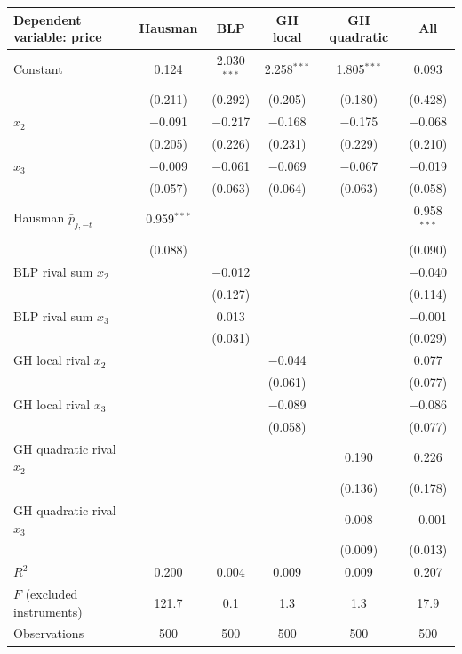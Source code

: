 \begin{tabular}{lccccc}
\toprule
Dependent variable: price & Hausman & BLP & GH local & GH quadratic & All \\
\midrule
Constant & 0.124 & 2.030$^{***}$ & 2.258$^{***}$ & 1.805$^{***}$ & 0.093 \\
 & (0.211) & (0.292) & (0.205) & (0.180) & (0.428) \\
$x_2$ & $-$0.091 & $-$0.217 & $-$0.168 & $-$0.175 & $-$0.068 \\
 & (0.205) & (0.226) & (0.231) & (0.229) & (0.210) \\
$x_3$ & $-$0.009 & $-$0.061 & $-$0.069 & $-$0.067 & $-$0.019 \\
 & (0.057) & (0.063) & (0.064) & (0.063) & (0.058) \\
Hausman $\bar p_{j,-t}$ & 0.959$^{***}$ &  &  &  & 0.958$^{***}$ \\
 & (0.088) &  &  &  & (0.090) \\
BLP rival sum $x_2$ &  & $-$0.012 &  &  & $-$0.040 \\
 &  & (0.127) &  &  & (0.114) \\
BLP rival sum $x_3$ &  & 0.013 &  &  & $-$0.001 \\
 &  & (0.031) &  &  & (0.029) \\
GH local rival $x_2$ &  &  & $-$0.044 &  & 0.077 \\
 &  &  & (0.061) &  & (0.077) \\
GH local rival $x_3$ &  &  & $-$0.089 &  & $-$0.086 \\
 &  &  & (0.058) &  & (0.077) \\
GH quadratic rival $x_2$ &  &  &  & 0.190 & 0.226 \\
 &  &  &  & (0.136) & (0.178) \\
GH quadratic rival $x_3$ &  &  &  & 0.008 & $-$0.001 \\
 &  &  &  & (0.009) & (0.013) \\
\midrule
$R^2$ & 0.200 & 0.004 & 0.009 & 0.009 & 0.207 \\
$F$ (excluded instruments) & 121.7 & 0.1 & 1.3 & 1.3 & 17.9 \\
Observations & 500 & 500 & 500 & 500 & 500 \\
\bottomrule
\end{tabular}
